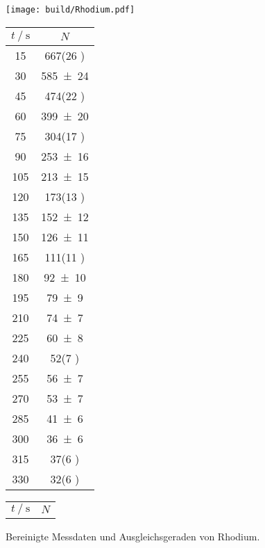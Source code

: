 \begin{figure}
\centering
\texttt{[image: build/Rhodium.pdf]}
\caption{Bereinigte Messdaten und Ausgleichsgeraden von Rhodium.}
\label{fig:R}
\begin{tabular}{S S}
\toprule
{$t \:/\: \si{\s}$} & {$N$} \\

\midrule

15	 & \num{667(26 )}  \\
30	 & \num{585(24) } \\	 
45	 & \num{474(22 )}  \\
60	 & \num{399(20) } \\
75	 & \num{304(17 )}  \\
90	 & \num{253(16) } \\
105	 & \num{213(15) } \\
120	 & \num{173(13 )}  \\
135	 & \num{152(12) } \\
150	 & \num{126(11) } \\
165	 & \num{111(11 )}  \\
180	 & \num{ 92(10) } \\
195	 & \num{ 79(9)  }\\
210	 & \num{ 74(7)  }\\
225	 & \num{ 60(8)  }\\
240	 & \num{ 52(7 ) } \\
255	 & \num{ 56(7)  }\\
270	 & \num{ 53(7)  }\\
285	 & \num{ 41(6)  }\\
300	 & \num{ 36(6)  }\\
315	 & \num{ 37(6 ) } \\
330	 & \num{ 32(6  )}  \\
\bottomrule
\end{tabular}
\begin{tabular}{S S}
\toprule
{$t \:/\: \si{\s}$} & {$N$} \\


\end{tabular}
\end{figure}
